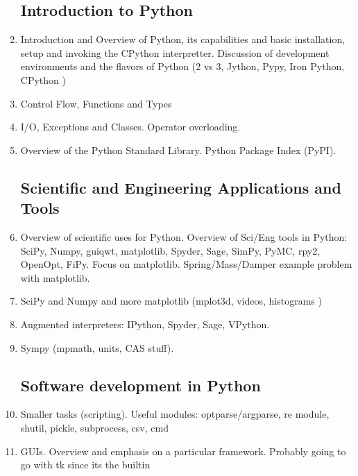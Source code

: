 \documentclass{report}
\begin{document}
\begin{enumerate}

\subsection{Introduction to Python}

    \item Introduction and Overview of Python, its capabilities and basic installation, setup and invoking the CPython interpretter. Discussion of development environments and the flavors of Python (2 vs 3, Jython, Pypy, Iron Python, CPython )

    \item Control Flow, Functions and Types

    \item I/O, Exceptions and Classes. Operator overloading.

    \item Overview of the Python Standard Library. Python Package Index (PyPI).

\subsection{Scientific and Engineering Applications and Tools}
    \item Overview of scientific uses for Python. Overview of Sci/Eng tools in Python: SciPy, Numpy, guiqwt, matplotlib, Spyder, Sage, SimPy, PyMC, rpy2, OpenOpt, FiPy. Focus on matplotlib. Spring/Mass/Damper example problem with matplotlib. 

    \item SciPy and Numpy and more matplotlib (mplot3d, videos, histograms )

    \item Augmented interpreters: IPython, Spyder, Sage, VPython.

    \item Sympy (mpmath, units, CAS stuff).

\subsection{Software development in Python}
    \item Smaller tasks (scripting). Useful modules: optparse/argparse, re module, shutil, pickle, subprocess, csv, cmd

    \item GUIs. Overview and emphasis on a particular framework. Probably going to go with tk since its the builtin


\end{enumerate}
\end{document}
